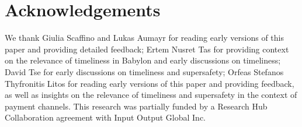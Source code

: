 \section{Acknowledgements}

We thank Giulia Scaffino and Lukas Aumayr for reading early versions of this paper
and providing detailed feedback;
Ertem Nusret Tas for providing context on the relevance
of timeliness in Babylon and early discussions on timeliness;
David Tse for early discussions on timeliness and supersafety;
Orfeas Stefanos Thyfronitis Litos for reading early versions of this paper
and providing feedback, as well as insights on the relevance
of timeliness and supersafety in the context of payment channels.
This research was partially funded by a Research Hub Collaboration agreement
with Input Output Global Inc.